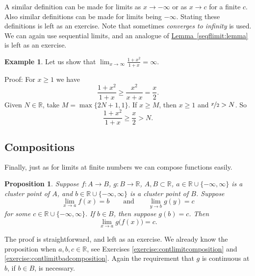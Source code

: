 \documentclass[12pt]{book}
\newcommand{\R}{{\mathbb{R}}}
\newcommand{\myindex}[1]{#1\index{#1}}
\theoremstyle{plain}
\newtheorem{prop}[thm]{Proposition}
\theoremstyle{remark}
\theoremstyle{definition}
\theoremstyle{exercise}
\theoremstyle{example}
\newtheorem{example}[thm]{Example}
\newcommand{\lemmaref}[1]{\hyperref[#1]{Lemma~\ref*{#1}}}
\begin{document}
A similar definition can be made for limits as $x \to -\infty$
or as $x \to c$ for a finite $c$.  Also similar definitions can be
made for limits being $-\infty$.  Stating these definitions is left
as an exercise.
Note that
sometimes \emph{\myindex{converges to infinity}} is used.
We can again use sequential limits, and an analogue of 
\lemmaref{seqflimit:lemma} is left as an exercise.

\begin{example}
Let us show that $\lim_{x \to \infty} \frac{1+x^2}{1+x} = \infty$.

Proof: For $x \geq 1$ we have
\begin{equation*}
\frac{1+x^2}{1+x} \geq 
\frac{x^2}{x+x}  = 
\frac{x}{2} .
\end{equation*}
Given $N \in \R$, take $M = \max \{ 2N+1 , 1 \}$.
If $x \geq M$, then $x \geq 1$ and $\nicefrac{x}{2} > N$.
So
\begin{equation*}
\frac{1+x^2}{1+x} \geq 
\frac{x}{2} > N .
\end{equation*}
\end{example}

\subsection{Compositions}

Finally, just as for limits at finite numbers we can compose functions
easily.

\begin{prop} \label{prop:inflimcompositions}
Suppose $f \colon A \to B$, $g \colon B \to \R$, $A, B \subset \R$, 
$a \in \R \cup \{ -\infty, \infty\}$ is a cluster point of $A$,
and $b \in \R \cup \{ -\infty, \infty\}$ is a cluster point of $B$.
Suppose 
\begin{equation*}
\lim_{x \to a} f(x) = b\qquad \text{and} \qquad \lim_{y \to b} g(y) = c
\end{equation*}
for some $c \in \R \cup \{ -\infty, \infty \}$.
If $b \in B$, then suppose $g(b) = c$.
Then
\begin{equation*}
\lim_{x \to a} g\bigl(f(x)\bigr) = c .
\end{equation*}
\end{prop}

The proof is straightforward, and left as an exercise.  We already
know the proposition when $a, b, c \in \R$, see Exercises
\ref{exercise:contlimitcomposition} and
\ref{exercise:contlimitbadcomposition}.  Again the requirement that $g$ is
continuous at $b$, if $b \in B$, is necessary.
\end{document}
